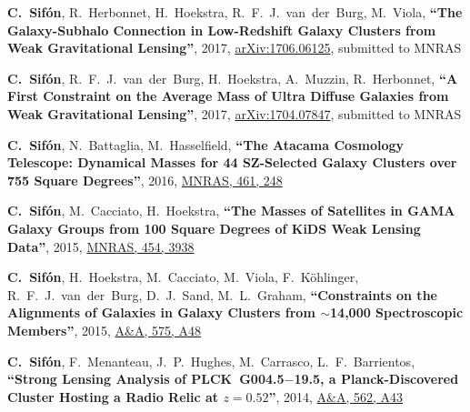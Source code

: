 \documentclass{article}
\def\myself{\textbf{\color{red} C.~Sif\'on}}
\def\aap{A\&A}
\def\mnras{MNRAS}
\newcommand{\submitted}[1]{submitted to #1}
\newcommand{\paper}[1]{\textbf{``#1''}}
\begin{document}
\vspace{-0.5cm}
\begin{etaremune}

\item
\myself, R.~Herbonnet, H.~Hoekstra, R.~F.~J.~van~der~Burg, M.~Viola,
\paper{The Galaxy-Subhalo Connection in Low-Redshift Galaxy Clusters from
Weak Gravitational Lensing},
2017, \href{http://adsabs.harvard.edu/abs/2017arXiv170606125S}{arXiv:1706.06125},
\submitted{\mnras}

\item
\myself, R.~F.~J.~van~der~Burg, H.~Hoekstra, A.~Muzzin, R.~Herbonnet,
\paper{A First Constraint on the Average Mass of Ultra Diffuse Galaxies from 
Weak Gravitational Lensing},
2017, \href{http://adsabs.harvard.edu/abs/2017arXiv170407847S}{arXiv:1704.07847},
\submitted{\mnras}

\item 
\myself, N.~Battaglia, M.~Hasselfield, 
\paper{The Atacama Cosmology Telescope: Dynamical Masses for 44 SZ-Selected Galaxy Clusters over 
755 Square Degrees},
2016, \href{http://adsabs.harvard.edu/abs/2016MNRAS.461..248S}{\mnras, 461, 248} 

\item
\myself, M.~Cacciato, H.~Hoekstra, 
\paper{The Masses of Satellites in GAMA Galaxy Groups from 100 Square Degrees of KiDS Weak Lensing 
Data},
2015, \href{https://adsabs.harvard.edu/abs/2015MNRAS.454.3938S}{\mnras, 454, 3938}

\item
\myself, H.~Hoekstra, M.~Cacciato, M.~Viola, F.~K\"ohlinger, R.~F.~J.~van~der~Burg, D.~J.~Sand, 
M.~L.~Graham,
\paper{Constraints on the Alignments of Galaxies in Galaxy Clusters from $\sim$14,000 Spectroscopic 
Members},
2015, \href{https://adsabs.harvard.edu/abs/2015A&A...575A..48S}{\aap, 575, A48}

\item
\myself, F.~Menanteau, J.~P.~Hughes, M.~Carrasco, L.~F.~Barrientos,
\paper{Strong Lensing Analysis of PLCK~G004.5$-$19.5, a Planck-Discovered Cluster Hosting a Radio 
Relic at $z=0.52$},
2014, \href{https://adsabs.harvard.edu/abs/2014A&A...562A..43S}{\aap, 562, A43}


\end{etaremune}
\end{document}
